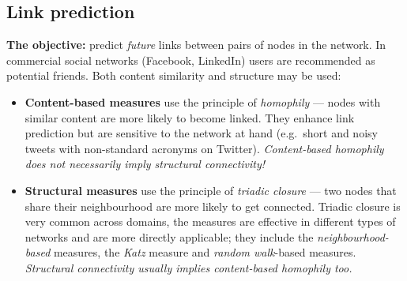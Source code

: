 \documentclass[11pt,a4paper]{article}
\theoremstyle{definition}
\begin{document}
\subsection{Link prediction}

\begin{defbox}
\textbf{The objective:} predict \emph{future} links between pairs of nodes in the network. In
commercial social networks (Facebook, LinkedIn) users are recommended as potential friends. Both
content similarity and structure may be used:
\begin{itemize}
\item \textbf{Content-based measures} use the principle of \emph{homophily} --- nodes with similar
      content are more likely to become linked. They enhance link prediction but are sensitive to the
      network at hand (e.g.\ short and noisy tweets with non-standard acronyms on Twitter).
      \emph{Content-based homophily does not necessarily imply structural connectivity!}
\item \textbf{Structural measures} use the principle of \emph{triadic closure} --- two nodes that share
      their neighbourhood are more likely to get connected. Triadic closure is very common across
      domains, the measures are effective in different types of networks and are more directly
      applicable; they include the \emph{neighbourhood-based} measures, the \emph{Katz} measure and
      \emph{random walk}-based measures. \emph{Structural connectivity usually implies content-based
      homophily too.}
\end{itemize}
\end{defbox}
\end{document}
